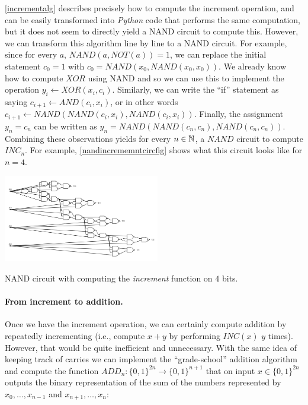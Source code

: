 \cref{incrementalg} describes precisely how to compute the increment
operation, and can be easily transformed into \emph{Python} code that
performs the same computation, but it does not seem to directly yield a
NAND circuit to compute this. However, we can transform this algorithm
line by line to a NAND circuit. For example, since for every \(a\),
\(\ensuremath{\mathit{NAND}}(a,\ensuremath{\mathit{NOT}}(a))=1\), we can
replace the initial statement \(c_0=1\) with
\(c_0 = \ensuremath{\mathit{NAND}}(x_0,\ensuremath{\mathit{NAND}}(x_0,x_0))\).
We already know how to compute \(\ensuremath{\mathit{XOR}}\) using NAND
and so we can use this to implement the operation
\(y_i \leftarrow \ensuremath{\mathit{XOR}}(x_i,c_i)\). Similarly, we can
write the ``if'' statement as saying
\(c_{i+1} \leftarrow \ensuremath{\mathit{AND}}(c_i,x_i)\), or in other
words
\(c_{i+1} \leftarrow \ensuremath{\mathit{NAND}}(\ensuremath{\mathit{NAND}}(c_i,x_i),\ensuremath{\mathit{NAND}}(c_i,x_i))\).
Finally, the assignment \(y_n = c_n\) can be written as
\(y_n = \ensuremath{\mathit{NAND}}(\ensuremath{\mathit{NAND}}(c_n,c_n),\ensuremath{\mathit{NAND}}(c_n,c_n))\).
Combining these observations yields for every \(n\in {\mathbb{N}}\), a
\(\ensuremath{\mathit{NAND}}\) circuit to compute
\(\ensuremath{\mathit{INC}}_n\). For example,
\cref{nandincrememntcircfig} shows what this circuit looks like for
\(n=4\).


\begin{marginfigure}
\centering
\includegraphics[width=\linewidth, height=1.5in, keepaspectratio]{../figure/incrementfromnand.png}
\caption{NAND circuit with computing the \emph{increment} function on
\(4\) bits.}
\label{nandincrememntcircfig}
\end{marginfigure}

\paragraph{From increment to addition.} Once we have the increment
operation, we can certainly compute addition by repeatedly incrementing
(i.e., compute \(x+y\) by performing \(\ensuremath{\mathit{INC}}(x)\)
\(y\) times). However, that would be quite inefficient and unnecessary.
With the same idea of keeping track of carries we can implement the
``grade-school'' addition algorithm and compute the function
\(\ensuremath{\mathit{ADD}}_n:\{0,1\}^{2n} \rightarrow \{0,1\}^{n+1}\)
that on input \(x\in \{0,1\}^{2n}\) outputs the binary representation of
the sum of the numbers represented by \(x_0,\ldots,x_{n-1}\) and
\(x_{n+1},\ldots,x_n\):

